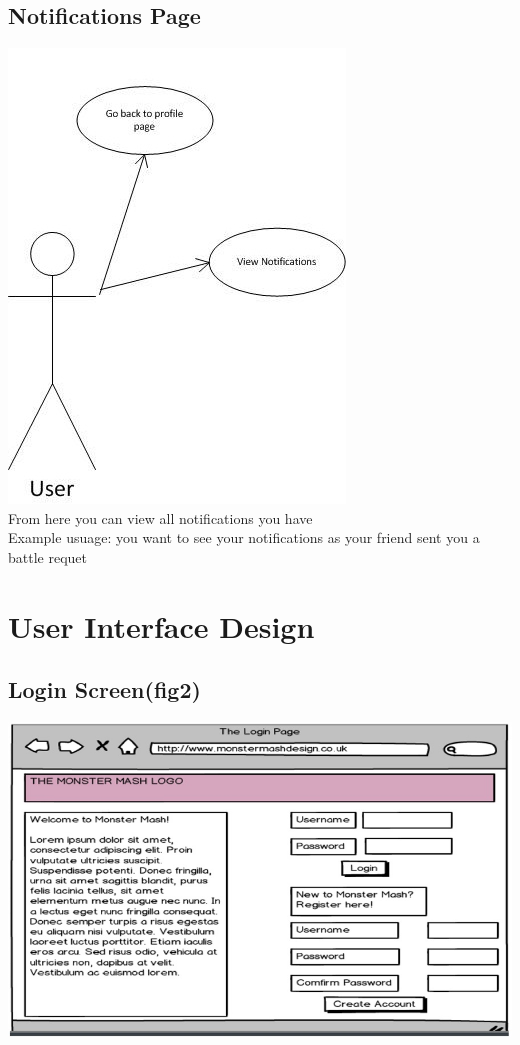 \documentclass{project}
\begin{document}
\subsection{Notifications Page}
\includegraphics[scale=0.6]{NotificationsPageUseCase.jpg}
\\
From here you can view all notifications you have
\\
Example usuage: you want to see your notifications as your friend sent you a battle requet


\section{User Interface Design}

\subsection{Login Screen(fig2)}
\includegraphics[scale=0.6]{loginPage.jpg}
\end{document}
